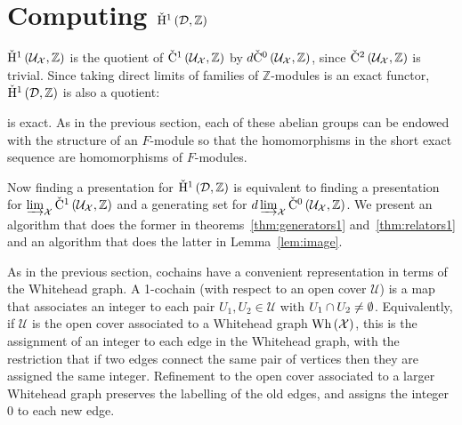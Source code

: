 \section{Computing $\check{\mathrm{H}}{}^1\left(\mathcal{D}, \mathbb{Z} \right)$} \label{sec:1st}

$\check{\mathrm{H}}{}^1\left(\mathcal{U}_\mathcal{X}, \mathbb{Z}\right)$ is the quotient of
$\check{\mathrm{C}}{}^1\left(\mathcal{U}_\mathcal{X}, \mathbb{Z}\right)$ by
$d\check{\mathrm{C}}{}^0\left(\mathcal{U}_\mathcal{X}, \mathbb{Z}\right)$, since
$\check{\mathrm{C}}{}^2\left(\mathcal{U}_\mathcal{X}, \mathbb{Z}\right)$ is trivial. Since
taking direct limits of families of $\mathbb{Z}$-modules is an exact functor,
$\check{\mathrm{H}}{}^1\left(\mathcal{D}, \mathbb{Z}\right)$ is also a quotient:
\begin{center}\end{center}
is exact. As in the previous section, each of these abelian groups can be
endowed with the structure of an $F$-module so that the homomorphisms in the
short exact sequence are homomorphisms of $F$-modules.

Now finding a presentation for $\check{\mathrm{H}}{}^1\left(\mathcal{D}, \mathbb{Z}\right)$
is equivalent to finding a presentation for $\varinjlim_\mathcal{X}
\check{\mathrm{C}}^1\left( \mathcal{U}_\mathcal{X}, \mathbb{Z}\right)$ and a generating set
for $d\varinjlim_\mathcal{X}\check{\mathrm{C}}{}^0\left(\mathcal{U}_\mathcal{X}, \mathbb{Z}
\right)$. We present an algorithm that does the former in
theorems~\ref{thm:generators1} and~\ref{thm:relators1} and an algorithm that
does the latter in Lemma~\ref{lem:image}.

As in the previous section, cochains have a convenient representation in terms
of the Whitehead graph. A 1-cochain (with respect to an open cover
$\mathcal{U}$) is a map that associates an integer to each pair $U_1, U_2
\in \mathcal{U}$ with $U_1 \cap U_2 \neq \emptyset$.  Equivalently,
if $\mathcal{U}$ is the open cover associated to a Whitehead graph
$\mathrm{Wh}\left(\mathcal{X}\right)$, this is the assignment of an integer to each edge in the
Whitehead graph, with the restriction that if two edges connect the same pair
of vertices then they are assigned the same integer. Refinement to the open
cover associated to a larger Whitehead graph preserves the labelling of the old
edges, and assigns the integer 0 to each new edge.

